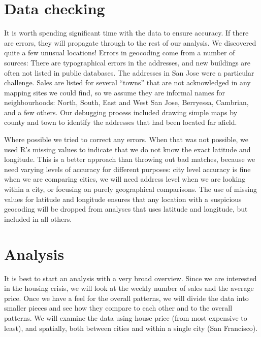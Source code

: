 \documentclass[oneside]{article}
\begin{document}

\section{Data checking}

It is worth spending significant time with the data to ensure accuracy.  If there are errors, they will propagate through to the rest of our analysis.  We discovered quite a few unusual locations!  Errors in geocoding come from a number of sources:  There are typographical errors in the addresses, and new buildings are often not listed in public databases.  The addresses in San Jose were a particular challenge.  Sales are listed for several ``towns'' that are not acknowledged in any mapping sites we could find, so we assume they are informal names for neighbourhoods: North, South, East and West San Jose, Berryessa, Cambrian, and a few others.  Our debugging process included drawing simple maps by county and town to identify the addresses that had been located far afield.

Where possible we tried to correct any errors.  When that was not possible, we used R's missing values to indicate that we do not know the exact latitude and longitude.  This is a better approach than throwing out bad matches, because we need varying levels of accuracy for different  purposes: city level accuracy is fine when we are comparing cities, we will need address level when we are looking within a city, or focusing on purely geographical comparisons.  The use of missing values for latitude and longitude ensures that any location with a suspicious geocoding will be dropped from analyses that uses latitude and longitude, but included in all others.

\section{Analysis}

It is best to start an analysis with a very broad overview.  Since we are interested in the housing crisis, we will look at the weekly number of sales and the average price.  Once we have a feel for the overall patterns, we will divide the data into smaller pieces and see how they compare to each other and to the overall patterns.  We will examine the data using house price (from most expensive to least), and spatially, both between cities and within a single city (San Francisco).
\end{document}
